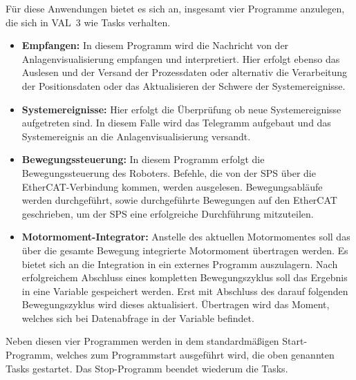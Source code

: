 \documentclass[ a4paper,
                oneside,
                toc=bibliography,
                toc=listof
                ]{scrbook}
\begin{document}
	Für diese Anwendungen bietet es sich an, insgesamt vier Programme anzulegen, die sich in VAL~3 wie Tasks verhalten.
	\begin{itemize}
		\item \textbf{Empfangen: } In diesem Programm wird die Nachricht von der Anlagenvisualisierung empfangen und interpretiert. Hier erfolgt ebenso das Auslesen und der Versand der Prozessdaten oder alternativ die Verarbeitung der Positionsdaten oder das Aktualisieren der Schwere der Systemereignisse.
		\item \textbf{Systemereignisse: } Hier erfolgt die Überprüfung ob neue Systemereignisse aufgetreten sind. In diesem Falle wird das Telegramm aufgebaut und das Systemereignis an die Anlagenvisualisierung versandt. 
		\item \textbf{Bewegungssteuerung:} In diesem Programm erfolgt die Bewegungssteuerung des Roboters. Befehle, die von der SPS über die EtherCAT-Verbindung kommen, werden ausgelesen. Bewegungsabläufe werden durchgeführt, sowie durchgeführte Bewegungen auf den EtherCAT geschrieben, um der SPS eine erfolgreiche Durchführung mitzuteilen.
		\item \textbf{Motormoment-Integrator:} Anstelle des aktuellen Motormomentes soll das über die gesamte Bewegung integrierte Motormoment übertragen werden. Es bietet sich an die Integration in ein externes Programm auszulagern. Nach erfolgreichem Abschluss eines kompletten Bewegungszyklus soll das Ergebnis in eine Variable gespeichert werden. Erst mit Abschluss des darauf folgenden Bewegungszyklus wird dieses aktualisiert. Übertragen wird das Moment, welches sich bei Datenabfrage in der Variable befindet.
	\end{itemize}
	Neben diesen vier Programmen werden in dem standardmäßigen \glqq Start\grqq-Programm, welches zum Programmstart ausgeführt wird, die oben genannten Tasks gestartet. Das \glqq Stop\grqq{}-Programm beendet wiederum die Tasks.
	\newpage
\end{document}
